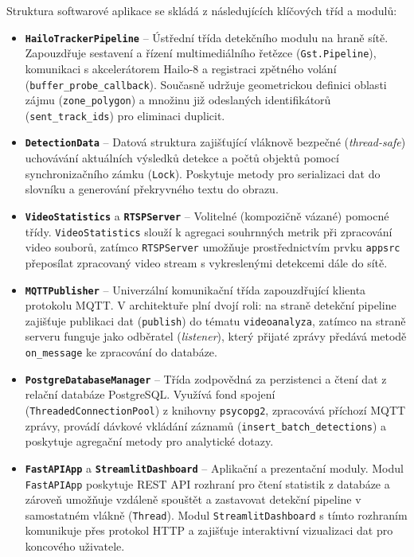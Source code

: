 \documentclass[male,czech,api_bc]{kitheses}
\begin{document}
Struktura softwarové aplikace se skládá z následujících klíčových tříd a modulů:
\begin{itemize}
    \item \textbf{\texttt{HailoTrackerPipeline}} – Ústřední třída detekčního modulu na hraně sítě. Zapouzdřuje sestavení a řízení multimediálního řetězce (\texttt{Gst.Pipeline}), komunikaci s akcelerátorem Hailo-8 a registraci zpětného volání (\texttt{buffer\_probe\_callback}). Současně udržuje geometrickou definici oblasti zájmu (\texttt{zone\_polygon}) a množinu již odeslaných identifikátorů (\texttt{sent\_track\_ids}) pro eliminaci duplicit.
    \item \textbf{\texttt{DetectionData}} – Datová struktura zajišťující vláknově bezpečné (\textit{thread-safe}) uchovávání aktuálních výsledků detekce a počtů objektů pomocí synchronizačního zámku (\texttt{Lock}). Poskytuje metody pro serializaci dat do slovníku a generování překryvného textu do obrazu.
    \item \textbf{\texttt{VideoStatistics}} a \textbf{\texttt{RTSPServer}} – Volitelné (kompozičně vázané) pomocné třídy. \texttt{VideoStatistics} slouží k agregaci souhrnných metrik při zpracování video souborů, zatímco \texttt{RTSPServer} umožňuje prostřednictvím prvku \texttt{appsrc} přeposílat zpracovaný video stream s vykreslenými detekcemi dále do sítě.
    \item \textbf{\texttt{MQTTPublisher}} – Univerzální komunikační třída zapouzdřující klienta protokolu MQTT. V architektuře plní dvojí roli: na straně detekční pipeline zajišťuje publikaci dat (\texttt{publish}) do tématu \texttt{videoanalyza}, zatímco na straně serveru funguje jako odběratel (\textit{listener}), který přijaté zprávy předává metodě \texttt{on\_message} ke zpracování do databáze.
    \item \textbf{\texttt{PostgreDatabaseManager}} – Třída zodpovědná za perzistenci a čtení dat z relační databáze PostgreSQL. Využívá fond spojení (\texttt{ThreadedConnectionPool}) z knihovny \texttt{psycopg2}, zpracovává příchozí MQTT zprávy, provádí dávkové vkládání záznamů (\texttt{insert\_batch\_detections}) a poskytuje agregační metody pro analytické dotazy.
    \item \textbf{\texttt{FastAPIApp}} a \textbf{\texttt{StreamlitDashboard}} – Aplikační a prezentační moduly. Modul \texttt{FastAPIApp} poskytuje REST API rozhraní pro čtení statistik z databáze a zároveň umožňuje vzdáleně spouštět a zastavovat detekční pipeline v samostatném vlákně (\texttt{Thread}). Modul \texttt{StreamlitDashboard} s tímto rozhraním komunikuje přes protokol HTTP a zajišťuje interaktivní vizualizaci dat pro koncového uživatele.
\end{itemize}
\end{document}
